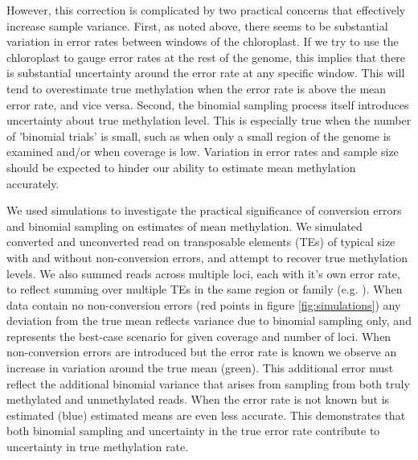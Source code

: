 \documentclass[12pt,longbibliography]{article}
\begin{document}
However, this correction is complicated by two practical concerns that effectively increase sample variance.
First, as noted above, there seems to be substantial variation in error rates between windows of the chloroplast.
If we try to use the chloroplast to gauge error rates at the rest of the genome, this implies that there is substantial uncertainty around the error rate at any specific window.
This will tend to overestimate true methylation when the error rate is above the mean error rate, and vice versa.
Second, the binomial sampling process itself introduces uncertainty about true methylation level.
This is especially true when the number of 'binomial trials' is small, such as when only a small region of the genome is examined and/or when coverage is low.
Variation in error rates and sample size should be expected to hinder our ability to estimate mean methylation accurately.

We used simulations to investigate the practical significance of conversion errors and binomial sampling on estimates of mean methylation.
We simulated converted and unconverted read on transposable elements (TEs) of typical size with and without non-conversion errors, and attempt to recover true methylation levels.
We also summed reads across multiple loci, each with it's own error rate, to reflect summing over multiple TEs in the same region or family (e.g. \cite{sasaki2019common}).
When data contain no non-conversion errors (red points in figure \ref{fig:simulations}) any deviation from the true mean reflects variance due to binomial sampling only, and represents the best-case scenario for given coverage and number of loci.
When non-conversion errors are introduced but the error rate is known we observe an increase in variation around the true mean (green).
This additional error must reflect the additional binomial variance that arises from sampling from both truly methylated and unmethylated reads.
When the error rate is not known but is estimated (blue) estimated means are even less accurate.
This demonstrates that both binomial sampling and uncertainty in the true error rate contribute to uncertainty in true methylation rate.
\end{document}
